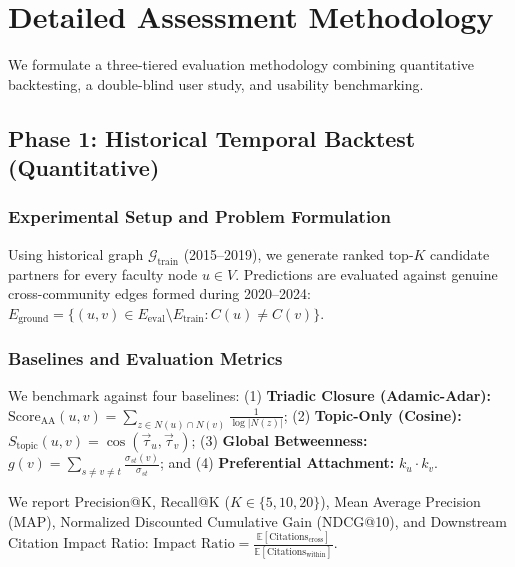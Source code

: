 \section{Detailed Assessment Methodology}

We formulate a three-tiered evaluation methodology combining quantitative backtesting, a double-blind user study, and usability benchmarking.

\subsection{Phase 1: Historical Temporal Backtest (Quantitative)}

\subsubsection{Experimental Setup and Problem Formulation}
Using historical graph $\mathcal{G}_{\text{train}}$ (2015--2019), we generate ranked top-$K$ candidate partners for every faculty node $u \in V$. Predictions are evaluated against genuine cross-community edges formed during 2020--2024: $E_{\text{ground}} = \{ (u, v) \in E_{\text{eval}} \setminus E_{\text{train}} : C(u) \neq C(v) \}$.

\subsubsection{Baselines and Evaluation Metrics}
We benchmark against four baselines: (1) \textbf{Triadic Closure (Adamic-Adar):} $\text{Score}_{\text{AA}}(u, v) = \sum_{z \in N(u) \cap N(v)} \frac{1}{\log |N(z)|}$; (2) \textbf{Topic-Only (Cosine):} $S_{\text{topic}}(u, v) = \cos(\vec{\tau}_u, \vec{\tau}_v)$; (3) \textbf{Global Betweenness:} $g(v) = \sum_{s \neq v \neq t} \frac{\sigma_{st}(v)}{\sigma_{st}}$; and (4) \textbf{Preferential Attachment:} $k_u \cdot k_v$.

We report Precision@K, Recall@K ($K \in \{5, 10, 20\}$), Mean Average Precision (MAP), Normalized Discounted Cumulative Gain (NDCG@10), and Downstream Citation Impact Ratio: $\text{Impact Ratio} = \frac{\mathbb{E}[\text{Citations}_{\text{cross}}]}{\mathbb{E}[\text{Citations}_{\text{within}}]}$.

